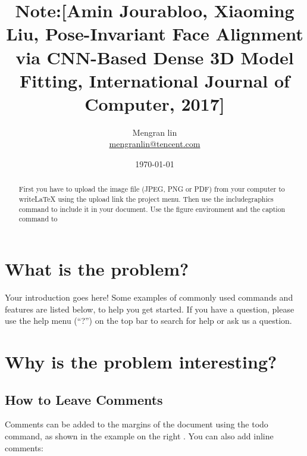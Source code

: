 \documentclass[]{article}
\begin{document}
%



%

\title{Note:[Amin Jourabloo, Xiaoming Liu,
Pose-Invariant Face Alignment via CNN-Based Dense 3D Model Fitting,
International Journal of Computer, 2017]
}

\author{Mengran lin \\ \href{mailto:mengranlin@tencent.com}{mengranlin@tencent.com}}
\date{\today}
\maketitle

\begin{abstract}
First you have to upload the image file (JPEG, PNG or PDF) from your computer to 
writeLaTeX using the upload link the project menu. Then use the includegraphics command
to include it in your document. Use the figure environment and the caption command to
\end{abstract}
\section{What is the problem?}

Your introduction goes here! Some examples of commonly used commands and features are listed below, to help you get started. If you have a question, please use the help menu (``?'') on the top bar to search for help or ask us a question.

\section{Why is the problem interesting?}
\label{sec:examples}

\subsection{How to Leave Comments}
Comments can be added to the margins of the document using the
 todo command, as shown in the example on the right
. You can also add inline comments:
\end{document}
